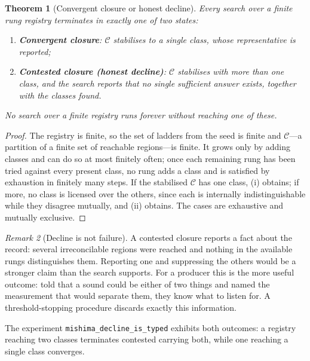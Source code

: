 \documentclass[11pt,twocolumn,a4paper]{article}
\newtheorem{theorem}{Theorem}[section]
\theoremstyle{definition}
\theoremstyle{remark}
\newtheorem{remark}[theorem]{Remark}
\newcommand{\Reached}{\mathcal{C}}
\begin{document}
\begin{theorem}[Convergent closure or honest decline]
\label{thm:decline}
Every search over a finite rung registry terminates in exactly one of two states:
\begin{enumerate}[label=(\roman*),leftmargin=2.2em]
\item \textbf{Convergent closure}: $\Reached$ stabilises to a single class, whose
  representative is reported;
\item \textbf{Contested closure (honest decline)}: $\Reached$ stabilises with
  more than one class, and the search reports that no single sufficient answer
  exists, together with the classes found.
\end{enumerate}
No search over a finite registry runs forever without reaching one of these.
\end{theorem}

\begin{proof}
The registry is finite, so the set of ladders from the seed is finite and
$\Reached$---a partition of a finite set of reachable regions---is finite. It
grows only by adding classes and can do so at most finitely often; once each
remaining rung has been tried against every present class, no rung adds a class
and  is satisfied by exhaustion in finitely many steps. If the
stabilised $\Reached$ has one class, (i) obtains; if more, no class is licensed
over the others, since each is internally indistinguishable while they disagree
mutually, and (ii) obtains. The cases are exhaustive and mutually exclusive.
\end{proof}

\begin{remark}[Decline is not failure]
\label{rem:decline-value}
A contested closure reports a fact about the record: several irreconcilable
regions were reached and nothing in the available rungs distinguishes them.
Reporting one and suppressing the others would be a stronger claim than the
search supports. For a producer this is the more useful outcome: told that a
sound could be either of two things and named the measurement that would separate
them, they know what to listen for. A threshold-stopping procedure discards
exactly this information.
\end{remark}

The experiment \texttt{mishima\_decline\_is\_typed} exhibits both outcomes: a
registry reaching two classes terminates contested carrying both, while one
reaching a single class converges.
\end{document}
